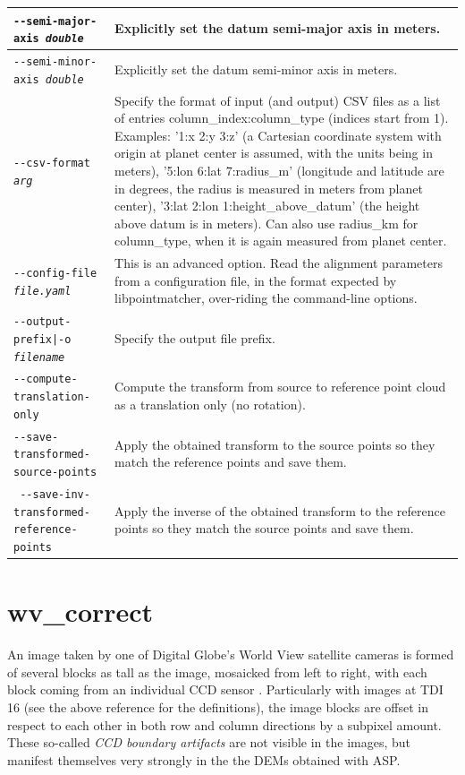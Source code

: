 \begin{longtable}{|p{8cm}|p{9cm}|}
\texttt{-\/-semi-major-axis \textit{double}} & Explicitly set the datum semi-major axis in meters.\\ \hline
\texttt{-\/-semi-minor-axis \textit{double}} & Explicitly set the datum semi-minor axis in meters.\\ \hline

\texttt{-\/-csv-format \textit{arg}} & Specify the format of input (and
output) CSV files as a list of entries column\_index:column\_type
(indices start from 1). Examples: '1:x 2:y 3:z' (a Cartesian coordinate
system with origin at planet center is assumed, with the units being in
meters), '5:lon 6:lat 7:radius\_m' (longitude and latitude are in
degrees, the radius is measured in meters from planet center), '3:lat
2:lon 1:height\_above\_datum' (the height above datum is in meters). Can
also use radius\_km for column\_type, when it is again measured from
planet center. \\ \hline

\texttt{-\/-config-file \textit{file.yaml}} & This is an advanced
option. Read the alignment parameters from a configuration file, in the
format expected by libpointmatcher, over-riding the command-line options.\\ \hline
\texttt{-\/-output-prefix|-o \textit{filename}} & Specify the output file prefix. \\ \hline
\texttt{-\/-compute-translation-only} & Compute the transform from source to reference point cloud as a translation only (no rotation). \\ \hline
\texttt{-\/-save-transformed-source-points} & Apply the obtained transform to the source points so they match the reference points and save them. \\ \hline
\texttt{ -\/-save-inv-transformed-reference-points} & Apply the inverse of the obtained transform to the reference points so they match the source points and save them.
\\ \hline
\end{longtable}


\section{wv\_correct}
\label{wvcorrect}

An image taken by one of Digital Globe's World View satellite cameras is
formed of several blocks as tall as the image, mosaicked from left to
right, with each block coming from an individual CCD sensor
\cite{digital-globe:camera}. Particularly with images at TDI 16 (see the
above reference for the definitions), the image blocks are offset in
respect to each other in both row and column directions by a subpixel
amount. These so-called {\it CCD boundary artifacts} are not visible in
the images, but manifest themselves very strongly in the the DEMs
obtained with ASP.
 
